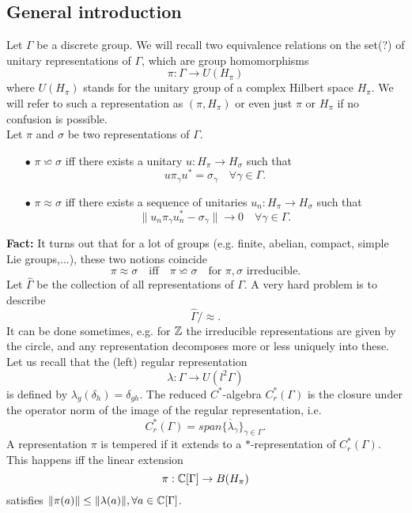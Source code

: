\subsection{General introduction}

Let $\Gamma$ be a discrete group. We will recall two equivalence relations on the set(?) of unitary representations of $\Gamma$, which are group homomorphisms
\[\pi: \Gamma \rightarrow U(H_\pi) \]
where $U(H_\pi)$ stands for the unitary group of a complex Hilbert space $H_\pi$. We will refer to such a representation as $(\pi, H_\pi)$ or even just $\pi$ or $H_\pi$ if no confusion is possible.\\

Let $\pi$ and $\sigma$ be two representations of $\Gamma$.
\begin{itemize}
\item[$\bullet$] $\pi \backsimeq \sigma$ iff there exists a unitary $u : H_\pi \rightarrow H_\sigma$ such that
\[ u\pi_\gamma u^* =\sigma_\gamma \quad \forall \gamma \in \Gamma.\]
\item[$\bullet$] $\pi \approx \sigma$ iff there exists a sequence of unitaries $u_n : H_\pi \rightarrow H_\sigma$ such that
\[ \| u_n\pi_\gamma u_n^* - \sigma_\gamma \| \rightarrow 0\quad \forall \gamma\in \Gamma.\]
\end{itemize}

\textbf{Fact:} It turns out that for a lot of groups (e.g. finite, abelian, compact, simple Lie groups,...), these two notions coincide
\[ \pi \approx \sigma \quad \text{iff}\quad \pi \backsimeq \sigma \quad \text{for }\pi,\sigma \text{ irreducible}.\]
Let $\hat \Gamma$ be the collection of all representations of $\Gamma$. A very hard problem is to describe
\[\hat \Gamma / \approx.\]
It can be done sometimes, e.g. for $\mathbb Z$ the irreducible representations are given by the circle, and any representation decomposes more or less uniquely into these.\\

Let us recall that the (left) regular representation 
\[\lambda: \Gamma \rightarrow U(l^2\Gamma)\]
is defined by $\lambda_g(\delta_h) = \delta_{gh}$. The reduced $C^*$-algebra $C_r^*(\Gamma)$ is the closure under the operator norm of the image of the regular representation, i.e.
\[C^*_r(\Gamma) = \overline{span \{ \lambda_\gamma\}_{\gamma\in \Gamma}}.\]
A representation $\pi $ is tempered if it extends to a $*$-representation of $C^*_r(\Gamma)$. This happens iff the linear extension
\[\pi : \mathbb C[\Gamma]\rightarrow B(H_\pi)\]
satisfies $\|\pi(a)\| \leq \|\lambda(a)\|, \forall a\in \mathbb C[\Gamma]$.\\

